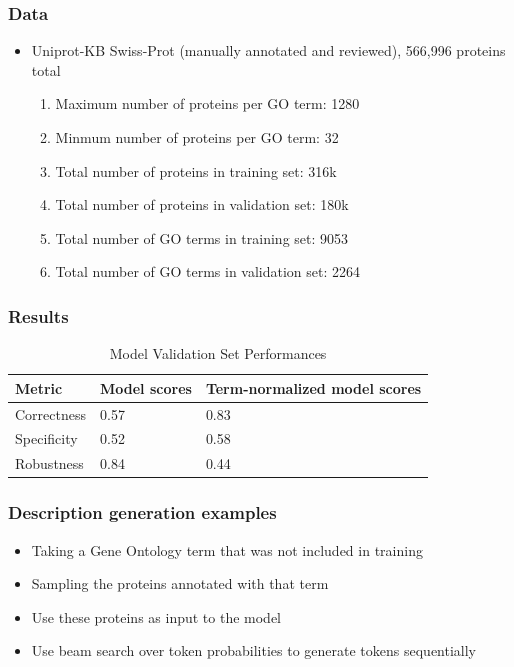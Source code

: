 \documentclass{beamer}
\begin{document}

\begin{frame}
    \frametitle{Data}
    \begin{itemize}
        \item Uniprot-KB Swiss-Prot (manually annotated and reviewed), 566,996 proteins total
        \begin{enumerate}
            \item Maximum number of proteins per GO term: 1280
            \item Minmum number of proteins per GO term: 32
            \item Total number of proteins in training set: 316k
            \item Total number of proteins in validation set: 180k
            \item Total number of GO terms in training set: 9053
            \item Total number of GO terms in validation set: 2264
        \end{enumerate}
    \end{itemize}
\end{frame}

\begin{frame}
\frametitle{Results}

\begin{table}
	\caption{Model Validation Set Performances}
	\centering
    \begin{tabular}{p{}|p{}|p{}}
		\toprule
        Metric & Model scores & Term-normalized model scores\\
		\midrule
        Correctness & 0.57 & 0.83\\
        Specificity & 0.52 & 0.58\\
        Robustness & 0.84 & 0.44\\
		\bottomrule
	\end{tabular}
	\label{tab:table}
\end{table}
\end{frame}

\begin{frame}
\frametitle{Description generation examples}
    \begin{itemize}
        \item Taking a Gene Ontology term that was not included in training\pause
        \item Sampling the proteins annotated with that term\pause
        \item Use these proteins as input to the model\pause
        \item Use beam search over token probabilities to generate tokens sequentially
    \end{itemize}
\end{frame}
\end{document}
